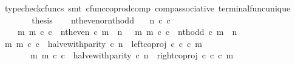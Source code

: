 \begin{isabellebody}
\ {\isacharparenleft}{\kern0pt}typecheck{\isacharunderscore}{\kern0pt}cfuncs{\isacharcomma}{\kern0pt}\ smt\ cfunc{\isacharunderscore}{\kern0pt}coprod{\isacharunderscore}{\kern0pt}comp\ comp{\isacharunderscore}{\kern0pt}associative{}\ terminal{\isacharunderscore}{\kern0pt}func{\isacharunderscore}{\kern0pt}unique{\isacharparenright}{\kern0pt}\isanewline
\ \ \ \ \isamarkupfalse%
\ \isamarkupfalse%
\ {\isacharquery}{\kern0pt}thesis\isacommand{{\isachardot}{\kern0pt}}\isamarkupfalse%
\isanewline
\ \ \isamarkupfalse%
\isanewline
{}\isamarkupfalse%
%
\endisatagproof
{\isafoldproof}%
%
\isadelimproof
\isanewline
%
\endisadelimproof
\isanewline
{}\isamarkupfalse%
\ nth{\isacharunderscore}{\kern0pt}even{\isacharunderscore}{\kern0pt}or{\isacharunderscore}{\kern0pt}nth{\isacharunderscore}{\kern0pt}odd{\isacharcolon}{\kern0pt}\isanewline
\ \ \ {\isachardoublequoteopen}n\ {\isasymin}\isactrlsub c\ {\isasymnat}\isactrlsub c{\isachardoublequoteclose}\isanewline
\ \ \ {\isachardoublequoteopen}{\isacharparenleft}{\kern0pt}{\isasymexists}\ m{\isachardot}{\kern0pt}\ m\ {\isasymin}\isactrlsub c\ {\isasymnat}\isactrlsub c\ {\isasymand}\ nth{\isacharunderscore}{\kern0pt}even\ {\isasymcirc}\isactrlsub c\ m\ {\isacharequal}{\kern0pt}\ n{\isacharparenright}{\kern0pt}\ {\isasymor}\ {\isacharparenleft}{\kern0pt}{\isasymexists}\ m{\isachardot}{\kern0pt}\ m\ {\isasymin}\isactrlsub c\ {\isasymnat}\isactrlsub c\ {\isasymand}\ nth{\isacharunderscore}{\kern0pt}odd\ {\isasymcirc}\isactrlsub c\ m\ {\isacharequal}{\kern0pt}\ n{\isacharparenright}{\kern0pt}{\isachardoublequoteclose}\isanewline
%
\isadelimproof
%
\endisadelimproof
%
\isatagproof
{}\isamarkupfalse%
\ {\isacharminus}{\kern0pt}\isanewline
\ \ \isamarkupfalse%
\ {\isachardoublequoteopen}{\isacharparenleft}{\kern0pt}{\isasymexists}m{\isachardot}{\kern0pt}\ m\ {\isasymin}\isactrlsub c\ {\isasymnat}\isactrlsub c\ {\isasymand}\ halve{\isacharunderscore}{\kern0pt}with{\isacharunderscore}{\kern0pt}parity\ {\isasymcirc}\isactrlsub c\ n\ {\isacharequal}{\kern0pt}\ left{\isacharunderscore}{\kern0pt}coproj\ {\isasymnat}\isactrlsub c\ {\isasymnat}\isactrlsub c\ {\isasymcirc}\isactrlsub c\ m{\isacharparenright}{\kern0pt}\isanewline
\ \ \ \ \ \ {\isasymor}\ {\isacharparenleft}{\kern0pt}{\isasymexists}m{\isachardot}{\kern0pt}\ m\ {\isasymin}\isactrlsub c\ {\isasymnat}\isactrlsub c\ {\isasymand}\ halve{\isacharunderscore}{\kern0pt}with{\isacharunderscore}{\kern0pt}parity\ {\isasymcirc}\isactrlsub c\ n\ {\isacharequal}{\kern0pt}\ right{\isacharunderscore}{\kern0pt}coproj\ {\isasymnat}\isactrlsub c\ {\isasymnat}\isactrlsub c\ {\isasymcirc}\isactrlsub c\ m{\isacharparenright}{\kern0pt}{\isachardoublequoteclose}\isanewline

\end{isabellebody}
